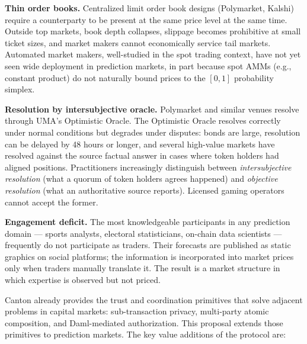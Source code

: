 \documentclass[11pt,a4paper]{article}
\begin{document}
\textbf{Thin order books.} Centralized limit order book designs (Polymarket, Kalshi) require a counterparty to be present at the same price level at the same time. Outside top markets, book depth collapses, slippage becomes prohibitive at small ticket sizes, and market makers cannot economically service tail markets. Automated market makers, well-studied in the spot trading context, have not yet seen wide deployment in prediction markets, in part because spot AMMs (e.g., constant product) do not naturally bound prices to the $[0, 1]$ probability simplex.

\textbf{Resolution by intersubjective oracle.} Polymarket and similar venues resolve through UMA's Optimistic Oracle. The Optimistic Oracle resolves correctly under normal conditions but degrades under disputes: bonds are large, resolution can be delayed by 48 hours or longer, and several high-value markets have resolved against the source factual answer in cases where token holders had aligned positions. Practitioners increasingly distinguish between \emph{intersubjective resolution} (what a quorum of token holders agrees happened) and \emph{objective resolution} (what an authoritative source reports). Licensed gaming operators cannot accept the former.

\textbf{Engagement deficit.} The most knowledgeable participants in any prediction domain --- sports analysts, electoral statisticians, on-chain data scientists --- frequently do not participate as traders. Their forecasts are published as static graphics on social platforms; the information is incorporated into market prices only when traders manually translate it. The result is a market structure in which expertise is observed but not priced.

Canton already provides the trust and coordination primitives that solve adjacent problems in capital markets: sub-transaction privacy, multi-party atomic composition, and Daml-mediated authorization. This proposal extends those primitives to prediction markets. The key value additions of the protocol are:
\end{document}
